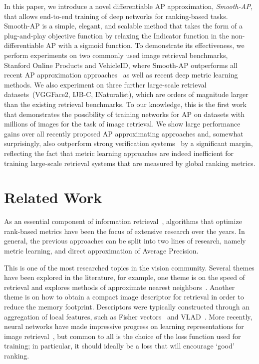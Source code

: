 \documentclass[runningheads]{llncs}
\begin{document}
In this paper, we introduce a novel differentiable AP approximation,  
{\em Smooth-AP}, 
that allows end-to-end training of deep networks for ranking-based tasks. 
Smooth-AP is a simple, elegant, and scalable method that takes the form of a plug-and-play objective function 
by relaxing the Indicator function in the non-differentiable AP with a sigmoid function.
To demonstrate its effectiveness, 
we perform experiments on two commonly used image retrieval benchmarks, Stanford Online Products and VehicleID, 
where Smooth-AP outperforms all recent AP approximation approaches~\cite{Cakir19,Rolnek20optimizing} 
as well as recent deep metric learning methods.
We also experiment on three further large-scale retrieval datasets~(VGGFace2, IJB-C, INaturalist), 
which are orders of magnitude larger than the existing retrieval benchmarks. 
To our knowledge, 
this is the first work that demonstrates the possibility of training networks for AP on datasets 
with millions of images for the task of image retrieval.
We show large performance gains over all recently proposed AP approximating approaches 
and, somewhat surprisingly, 
also outperform strong verification systems~\cite{Deng19,Liu17} by a significant margin, 
reflecting the fact that metric learning approaches are indeed inefficient for training large-scale retrieval systems that are measured by global ranking metrics.

 \label{sec:intro}


\section{Related Work}
As an essential component of information retrieval~\cite{Manning08}, 
algorithms that optimize rank-based metrics have been the focus of extensive research over the years.
In general, the previous approaches can be split into two lines of research, 
namely metric learning, and direct approximation of Average Precision.

This is one of the most researched topics in the vision community.
Several themes have been explored in the literature,
for example, 
one theme is on the speed of retrieval
and explores methods of approximate nearest neighbors~\cite{Chum11,Jegou08,Jegou11,Jegou11b,Philbin07,Sivic03}.
Another theme is on how to obtain a compact image descriptor for retrieval in order to reduce the memory footprint.
Descriptors were typically constructed through an aggregation of local features, 
such as Fisher vectors~\cite{Perronnin10} and VLAD~\cite{Arandjelovic2013,Jegou10}.
More recently, neural networks have made impressive progress on learning representations for image retrieval~\cite{Arandjelovic16,Babenko14,Gordo16,Radenovic16,Wang14_deepranking},
but common to all is the choice of the loss function used for training; 
in particular, it should ideally be a loss that will encourage ‘good’ ranking.
\end{document}
